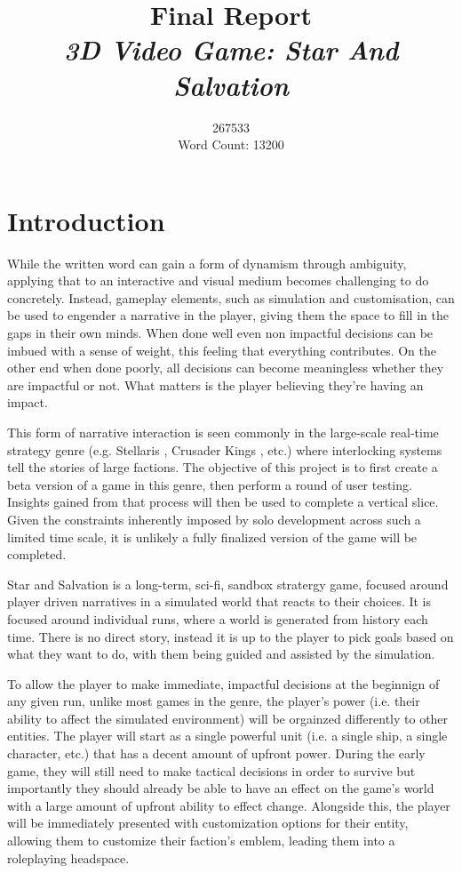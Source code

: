 \documentclass{report}
\begin{document}
\title{
Final Report \\ 
\textit{3D Video Game: Star And Salvation} }
\author{267533\\
\large Word Count: 13200}

\maketitle

\tableofcontents

\chapter{Introduction}
While the written word can gain a form of dynamism through ambiguity, applying that to an interactive and visual medium becomes challenging to do concretely. Instead, gameplay elements, such as simulation and customisation, can be used to engender a narrative in the player, giving them the space to fill in the gaps in their own minds. When done well even non impactful decisions can be imbued with a sense of weight, this feeling that everything contributes. On the other end when done poorly, all decisions can become meaningless whether they are impactful or not. What matters is the player believing they're having an impact. 

This form of narrative interaction is seen commonly in the large-scale real-time strategy genre (e.g. Stellaris \cite{stellaris}, Crusader Kings \cite{crusaderkings}, etc.) where interlocking systems tell the stories of large factions. The objective of this project is to first create a beta version of a game in this genre, then perform a round of user testing. Insights gained from that process will then be used to complete a vertical slice. Given the constraints inherently imposed by solo development across such a limited time scale, it is unlikely a fully finalized version of the game will be completed.

Star and Salvation is a long-term, sci-fi, sandbox stratergy game, focused around player driven narratives in a simulated world that reacts to their choices. It is focused around individual runs, where a world is generated from history each time. There is no direct story, instead it is up to the player to pick goals based on what they want to do, with them being guided and assisted by the simulation.

To allow the player to make immediate, impactful decisions at the beginnign of any given run, unlike most games in the genre, the player's power (i.e. their ability to affect the simulated environment) will be orgainzed differently to other entities. The player will start as a single powerful unit (i.e. a single ship, a single character, etc.) that has a decent amount of upfront power. During the early game, they will still need to make tactical decisions in order to survive but importantly they should already be able to have an effect on the game's world with a large amount of upfront ability to effect change. Alongside this, the player will be immediately presented with customization options for their entity, allowing them to customize their faction's emblem, leading them into a roleplaying headspace.
\end{document}

